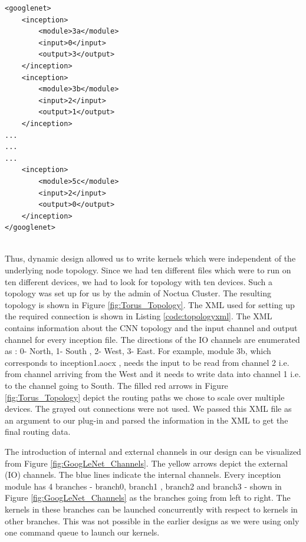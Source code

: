 \begin{code}[!htb]
 \begin{verbatim}
<googlenet>
	<inception>
		<module>3a</module>           
		<input>0</input>				
		<output>3</output>
	</inception>
	<inception>
		<module>3b</module>
		<input>2</input>				
		<output>1</output>
	</inception>
...
...
...
	<inception>
		<module>5c</module>
		<input>2</input>				
		<output>0</output>
	</inception>
</googlenet>


\end{verbatim}
\label{code:topologyxml}
\end{code}
Thus, dynamic design allowed us to write kernels which were independent of the underlying node topology. Since we had ten different files which were to run on ten different devices, we had to look for topology with ten devices. Such a topology was set up for us by the admin of Noctua Cluster. The resulting topology is shown in Figure \ref{fig:Torus_Topology}. The XML used for setting up the required connection is shown in Listing \ref{code:topologyxml}. The XML contains information about the CNN topology and the input channel and output channel for every inception file. The directions of the IO channels are enumerated as : 0- North, 1- South , 2- West, 3- East. For example, module 3b, which corresponds to inception1.aocx , needs the input to be read from channel 2 i.e. from channel arriving from the West and it needs to write data into channel 1 i.e. to the channel going to South.  
The filled red arrows in Figure \ref{fig:Torus_Topology} depict the routing paths we chose to scale over multiple devices. The grayed out connections were not used. We passed this XML file as an argument to our plug-in and parsed the information in the XML to get the final routing data. 

The introduction of internal and external channels in our design can be visualized from Figure \ref{fig:GoogLeNet_Channels}. The yellow arrows depict the external (IO) channels. The blue lines indicate the internal channels. Every inception module has 4 branches - branch0, branch1 , branch2 and branch3 - shown in Figure \ref{fig:GoogLeNet_Channels} as the branches going from left to right. The kernels in these branches can be launched concurrently with respect to kernels in other branches.  This was not possible in the earlier designs as we were using only one command queue to launch our kernels.

